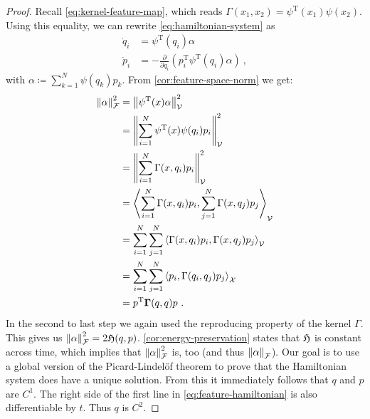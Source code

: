 \begin{proof}
	Recall \cref{eq:kernel-feature-map}, which reads $\Gamma(x_1, x_2) = \psi^\mathrm{T}(x_1)\psi(x_2)$.
	Using this equality, we can rewrite \cref{eq:hamiltonian-system} as
	\begin{equation}
	\label{eq:feature-hamiltonian}
		\begin{split}
			\dot{q}_i &= \psi^\mathrm{T}(q_i) \alpha\\
			\dot{p}_i &= -\frac{\partial}{\partial q_i} \left(p_i^\mathrm{T} \psi^\mathrm{T}(q_i) \alpha \right)\ ,
		\end{split}
	\end{equation}
	with $\alpha \coloneqq \sum_{k=1}^{N} \psi(q_k) p_k$.
	From \cref{cor:feature-space-norm} we get:
	\begin{align}
		\norm{\alpha}_{\mathcal{F}}^2 &= \norm{\psi^{\mathrm{T}}(x) \alpha}_{\mathcal{V}}^2\\
		&= \norm{\sum_{i=1}^N \psi^{\mathrm{T}}(x) \psi(q_i)p_i}_{\mathcal{V}}^2 \\
		&= \norm{\sum_{i=1}^N \Gamma(x, q_i) p_i}_{\mathcal{V}}^2\\
		&= \left<\sum_{i=1}^N\Gamma(x, q_i)p_i, \sum_{j=1}^N \Gamma(x, q_j) p_j \right>_{\mathcal{V}}\\
		&= \sum_{i=1}^N \sum_{j=1}^N \left<\Gamma(x, q_i)p_i, \Gamma(x, q_j) p_j \right>_{\mathcal{V}}\\
		&= \sum_{i=1}^N \sum_{j=1}^N \left<p_i, \Gamma(q_i, q_j) p_j\right>_{\mathcal{X}}\\
		&= p^{\mathrm{T}} \mathbf{\Gamma}(q, q) p \ .
	\end{align}
	In the second to last step we again used the reproducing property of the kernel $\Gamma$.
	This gives us $\norm{\alpha}_{\mathcal{F}}^2 = 2 \mathfrak{H}(q, p)$.
	\cref{cor:energy-preservation} states that $\mathfrak{H}$ is constant across time, which implies that $\norm{\alpha}_{\mathcal{F}}^2$ is, too (and thus  $\norm{\alpha}_{\mathcal{F}}$).
	Our goal is to use a global version of the Picard-Lindelöf theorem \cite[~Theorem 1.2.3]{arino06} to prove that the Hamiltonian system does have a unique solution.
	From this it immediately follows that $q$ and $p$ are $C^1$.
	The right side of the first line in \cref{eq:feature-hamiltonian} is also differentiable by $t$.
	Thus $q$ is $C^2$.
	

\end{proof}
